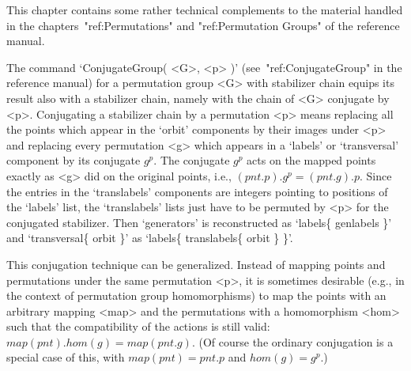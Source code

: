 
This  chapter contains some rather  technical complements to the material
handled in the chapters~"ref:Permutations" and "ref:Permutation Groups" of
the reference manual.


The command `ConjugateGroup( <G>, <p> )' (see~"ref:ConjugateGroup" in the
reference manual) for a  permutation  group  <G>  with  stabilizer  chain
equips its result also with a stabilizer chain, namely with the chain  of
<G> conjugate by <p>. Conjugating a stabilizer chain by a permutation <p>
means replacing all the points which appear in the `orbit' components  by
their images under <p> and replacing every permutation <g> which  appears
in a `labels' or `transversal' component  by  its  conjugate  $g^p$.  The
conjugate $g^p$ acts on the mapped points  exactly  as  <g>  did  on  the
original points, i.e., $(pnt.p). g^p = (pnt.g).p$. Since the  entries  in
the `translabels' components are integers pointing to  positions  of  the
`labels' list, the `translabels' lists just have to be  permuted  by  <p>
for the conjugated stabilizer.  Then  `generators'  is  reconstructed  as
`labels\{  genlabels  \}'  and  `transversal\{  orbit  \}'  as  `labels\{
translabels\{ orbit \} \}'.

This conjugation technique can be generalized. Instead of mapping  points
and  permutations  under  the  same  permutation  <p>,  it  is  sometimes
desirable (e.g., in the context of permutation  group  homomorphisms)  to
map the points with an arbitrary mapping <map> and the permutations  with
a homomorphism <hom> such that the compatibility of the actions is  still
valid:   $map(pnt).hom(g) = map(pnt.g)$.   (Of   course    the   ordinary
conjugation is a special case  of  this,  with   $map(pnt) = pnt.p$   and
$hom(g) = g^p$.)

